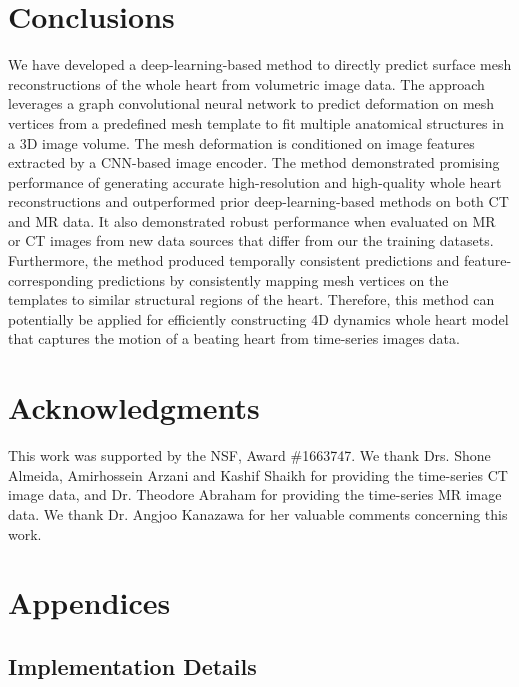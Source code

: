 \documentclass[times,review,preprint,authoryear]{elsarticle}
\begin{document}
\section{Conclusions}
We have developed a deep-learning-based method to directly predict surface mesh reconstructions of the whole heart from volumetric image data. The approach leverages a graph convolutional neural network to predict deformation on mesh vertices from a predefined mesh template to fit multiple anatomical structures in a 3D image volume. The mesh deformation is conditioned on image features extracted by a CNN-based image encoder. The method demonstrated promising performance of generating accurate high-resolution and high-quality whole heart reconstructions and outperformed prior deep-learning-based methods on both CT and MR data. It also demonstrated robust performance when evaluated on MR or CT images from new data sources that differ from our the training datasets. Furthermore, the method produced temporally consistent predictions and feature-corresponding predictions by consistently mapping mesh vertices on the templates to similar structural regions of the heart. Therefore, this method can potentially be applied for efficiently constructing 4D dynamics whole heart model that captures the motion of a beating heart from time-series images data.

\section*{Acknowledgments}
This work was supported by the NSF, Award \#1663747. We thank Drs. Shone Almeida, Amirhossein Arzani and Kashif Shaikh for providing the time-series CT image data, and Dr. Theodore Abraham for providing the time-series MR image data. We thank Dr. Angjoo Kanazawa for her valuable comments concerning this work.



\newpage
\renewcommand{\thesubsection}{\Alph{subsection}}
\renewcommand{\thefigure}{B\arabic{figure}}
\renewcommand{\thetable}{B\arabic{table}}
\section*{Appendices}
\subsection{Implementation Details}
\end{document}
